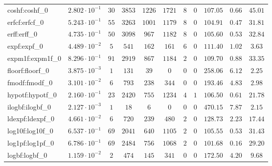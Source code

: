 \begin{tabular}{|l|c|c|c|c|c|c|c|c|c|c|}
coshf:coshf\_0               & $ 2.802 \cdot 10^{-1} $ & $ 30     $ & $ 3853  $ & $ 1226  $ & $ 1721  $ & $ 8   $ & $ 0 $ & $ 107.05      $ & $ 0.66    $ & $ 45.01   $ \\
erfcf:erfcf\_0               & $ 5.243 \cdot 10^{-1} $ & $ 55     $ & $ 3263  $ & $ 1001  $ & $ 1179  $ & $ 8   $ & $ 0 $ & $ 104.91      $ & $ 0.47    $ & $ 31.81   $ \\
erff:erff\_0                 & $ 4.735 \cdot 10^{-1} $ & $ 50     $ & $ 3098  $ & $ 967   $ & $ 1182  $ & $ 8   $ & $ 0 $ & $ 105.60      $ & $ 0.53    $ & $ 32.84   $ \\
expf:expf\_0                 & $ 4.489 \cdot 10^{-2} $ & $ 5      $ & $ 541   $ & $ 162   $ & $ 161   $ & $ 6   $ & $ 0 $ & $ 111.40      $ & $ 1.02    $ & $ 3.63    $ \\
expm1f:expm1f\_0             & $ 8.296 \cdot 10^{-1} $ & $ 91     $ & $ 2919  $ & $ 867   $ & $ 1184  $ & $ 2   $ & $ 0 $ & $ 109.70      $ & $ 0.88    $ & $ 33.35   $ \\
floorf:floorf\_0             & $ 3.875 \cdot 10^{-3} $ & $ 1      $ & $ 131   $ & $ 39    $ & $ 0     $ & $ 0   $ & $ 0 $ & $ 258.06      $ & $ 6.12    $ & $ 2.25    $ \\
fmodf:fmodf\_0               & $ 3.101 \cdot 10^{-2} $ & $ 6      $ & $ 793   $ & $ 238   $ & $ 344   $ & $ 0   $ & $ 0 $ & $ 193.46      $ & $ 4.83    $ & $ 2.98    $ \\
hypotf:hypotf\_0             & $ 2.160 \cdot 10^{-1} $ & $ 23     $ & $ 2420  $ & $ 755   $ & $ 1234  $ & $ 4   $ & $ 1 $ & $ 106.50      $ & $ 0.61    $ & $ 21.78   $ \\
ilogbf:ilogbf\_0             & $ 2.127 \cdot 10^{-3} $ & $ 1      $ & $ 18    $ & $ 6     $ & $ 0     $ & $ 0   $ & $ 0 $ & $ 470.15      $ & $ 7.87    $ & $ 2.15    $ \\
ldexpf:ldexpf\_0             & $ 4.661 \cdot 10^{-2} $ & $ 6      $ & $ 720   $ & $ 239   $ & $ 480   $ & $ 2   $ & $ 0 $ & $ 128.73      $ & $ 2.23    $ & $ 17.44   $ \\
log10f:log10f\_0             & $ 6.537 \cdot 10^{-1} $ & $ 69     $ & $ 2041  $ & $ 640   $ & $ 1105  $ & $ 2   $ & $ 0 $ & $ 105.55      $ & $ 0.53    $ & $ 31.43   $ \\
log1pf:log1pf\_0             & $ 6.786 \cdot 10^{-1} $ & $ 69     $ & $ 2484  $ & $ 756   $ & $ 1068  $ & $ 2   $ & $ 0 $ & $ 101.68      $ & $ 0.16    $ & $ 29.20   $ \\
logbf:logbf\_0               & $ 1.159 \cdot 10^{-2} $ & $ 2      $ & $ 474   $ & $ 145   $ & $ 341   $ & $ 0   $ & $ 0 $ & $ 172.50      $ & $ 4.20    $ & $ 9.68    $ \\

\end{tabular}
